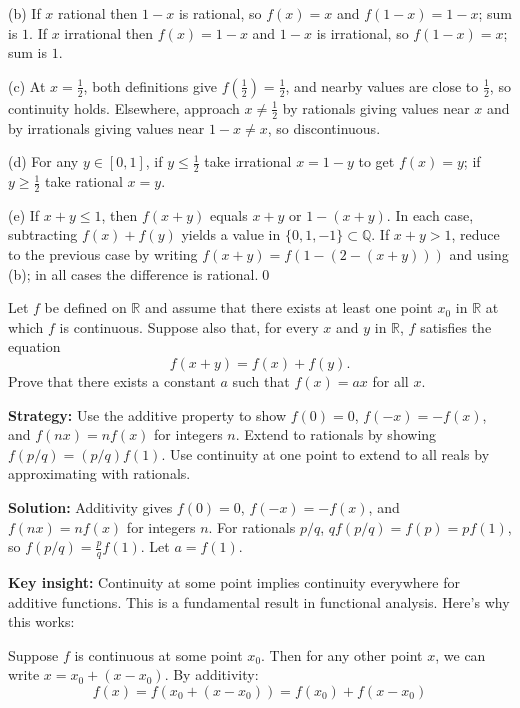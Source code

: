 (b) If $x$ rational then $1-x$ is rational, so $f(x)=x$ and $f(1-x)=1-x$; sum is $1$. If $x$ irrational then $f(x)=1-x$ and $1-x$ is irrational, so $f(1-x)=x$; sum is $1$.

(c) At $x=\tfrac12$, both definitions give $f(\tfrac12)=\tfrac12$, and nearby values are close to $\tfrac12$, so continuity holds. Elsewhere, approach $x\ne\tfrac12$ by rationals giving values near $x$ and by irrationals giving values near $1-x\ne x$, so discontinuous.

(d) For any $y\in[0,1]$, if $y\le \tfrac12$ take irrational $x=1-y$ to get $f(x)=y$; if $y\ge \tfrac12$ take rational $x=y$.

(e) If $x+y\le 1$, then $f(x+y)$ equals $x+y$ or $1-(x+y)$. In each case, subtracting $f(x)+f(y)$ yields a value in $\{0,1,-1\}\subset \mathbb{Q}$. If $x+y>1$, reduce to the previous case by writing $f(x+y)=f(1-(2-(x+y)))$ and using (b); in all cases the difference is rational.\qed



\begin{problembox}
\begin{problemstatement}
Let \( f \) be defined on \( \mathbb{R} \) and assume that there exists at least one point \( x_0 \) in \( \mathbb{R} \) at which \( f \) is continuous. Suppose also that, for every \( x \) and \( y \) in \( \mathbb{R} \), \( f \) satisfies the equation
\[f(x + y) = f(x) + f(y).\]
Prove that there exists a constant \( a \) such that \( f(x) = ax \) for all \( x \).
\end{problemstatement}
\end{problembox}

\noindent\textbf{Strategy:} Use the additive property to show $f(0) = 0$, $f(-x) = -f(x)$, and $f(nx) = nf(x)$ for integers $n$. Extend to rationals by showing $f(p/q) = (p/q)f(1)$. Use continuity at one point to extend to all reals by approximating with rationals.

\bigskip\noindent\textbf{Solution:}
Additivity gives $f(0)=0$, $f(-x)=-f(x)$, and $f(nx)=nf(x)$ for integers $n$. For rationals $p/q$, $qf(p/q)=f(p)=pf(1)$, so $f(p/q)=\tfrac{p}{q}f(1)$. Let $a=f(1)$. 

\medskip\noindent\textbf{Key insight:} Continuity at some point implies continuity everywhere for additive functions. This is a fundamental result in functional analysis. Here's why this works:

Suppose $f$ is continuous at some point $x_0$. Then for any other point $x$, we can write $x = x_0 + (x - x_0)$. By additivity:
\[f(x) = f(x_0 + (x - x_0)) = f(x_0) + f(x - x_0)\]

